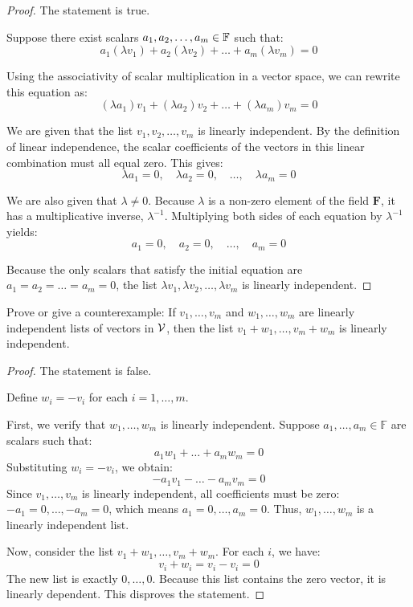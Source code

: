 \begin{proof}
	The statement is true.
	
	Suppose there exist scalars $a_1, a_2, \dots, a_m \in \mathbb{F}$ such that:
	\[
	a_1(\lambda v_1) + a_2(\lambda v_2) + \dots + a_m(\lambda v_m) = 0
	\]
	
	Using the associativity of scalar multiplication in a vector space, we can rewrite this equation as:
	\[
	(\lambda a_1)v_1 + (\lambda a_2)v_2 + \dots + (\lambda a_m)v_m = 0
	\]
	
	We are given that the list $v_1, v_2, \dots, v_m$ is linearly independent. By the definition of linear independence, the scalar coefficients of the vectors in this linear combination must all equal zero. This gives:
	\[
	\lambda a_1 = 0, \quad \lambda a_2 = 0, \quad \dots, \quad \lambda a_m = 0
	\]
	
	We are also given that $\lambda \neq 0$. Because $\lambda$ is a non-zero element of the field $\mathbf{F}$, it has a multiplicative inverse, $\lambda^{-1}$. Multiplying both sides of each equation by $\lambda^{-1}$ yields:
	\[
	a_1 = 0, \quad a_2 = 0, \quad \dots, \quad a_m = 0
	\]
	
	Because the only scalars that satisfy the initial equation are $a_1 = a_2 = \dots = a_m = 0$, the list $\lambda v_1, \lambda v_2, \dots, \lambda v_m$ is linearly independent.
\end{proof}
\begin{question}
	Prove or give a counterexample: If $v_1, \dots, v_m$ and $w_1, \dots, w_m$ are linearly independent lists of vectors in $\mathcal{V}$, then the list $v_1 + w_1, \dots, v_m + w_m$ is linearly independent.
\end{question}
\begin{proof}
		The statement is false. 
	
	Define $w_i = -v_i$ for each $i = 1, \dots, m$.
	
	First, we verify that $w_1, \dots, w_m$ is linearly independent. Suppose $a_1, \dots, a_m \in \mathbb{F}$ are scalars such that:
	\[
	a_1 w_1 + \dots + a_m w_m = 0
	\]
	Substituting $w_i = -v_i$, we obtain:
	\[
	-a_1 v_1 - \dots - a_m v_m = 0
	\]
	Since $v_1, \dots, v_m$ is linearly independent, all coefficients must be zero: $-a_1 = 0, \dots, -a_m = 0$, which means $a_1 = 0, \dots, a_m = 0$. Thus, $w_1, \dots, w_m$ is a linearly independent list.
	
	Now, consider the list $v_1 + w_1, \dots, v_m + w_m$. For each $i$, we have:
	\[
	v_i + w_i = v_i - v_i = 0
	\]
	The new list is exactly $0, \dots, 0$. Because this list contains the zero vector, it is linearly dependent. This disproves the statement.
\end{proof}
